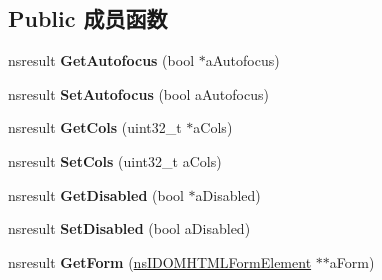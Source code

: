 \subsection*{Public 成员函数}
\begin{DoxyCompactItemize}
\item 
\mbox{\label{interfacens_i_d_o_m_h_t_m_l_text_area_element_a81e1075ea24f0a28fe673ee47a5c7806}} 
nsresult {\bfseries Get\+Autofocus} (bool $\ast$a\+Autofocus)
\item 
\mbox{\label{interfacens_i_d_o_m_h_t_m_l_text_area_element_a15260f463753e149b841ff6d5cf72284}} 
nsresult {\bfseries Set\+Autofocus} (bool a\+Autofocus)
\item 
\mbox{\label{interfacens_i_d_o_m_h_t_m_l_text_area_element_a25c882c3c93f1551d3289b627df73928}} 
nsresult {\bfseries Get\+Cols} (uint32\+\_\+t $\ast$a\+Cols)
\item 
\mbox{\label{interfacens_i_d_o_m_h_t_m_l_text_area_element_a9ba93305d500d5ab18d443630e4375aa}} 
nsresult {\bfseries Set\+Cols} (uint32\+\_\+t a\+Cols)
\item 
\mbox{\label{interfacens_i_d_o_m_h_t_m_l_text_area_element_a64b30982633bdc2f24694e37eb7742eb}} 
nsresult {\bfseries Get\+Disabled} (bool $\ast$a\+Disabled)
\item 
\mbox{\label{interfacens_i_d_o_m_h_t_m_l_text_area_element_a6aa0dd7d0bbbcd29f352a693d4ee201e}} 
nsresult {\bfseries Set\+Disabled} (bool a\+Disabled)
\item 
\mbox{\label{interfacens_i_d_o_m_h_t_m_l_text_area_element_a09955796882fa68d1c0629b8ad2f665f}} 
nsresult {\bfseries Get\+Form} (\hyperlink{interfacens_i_d_o_m_h_t_m_l_form_element}{ns\+I\+D\+O\+M\+H\+T\+M\+L\+Form\+Element} $\ast$$\ast$a\+Form)
\item 
\mbox{\label{interfacens_i_d_o_m_h_t_m_l_text_area_element_adc11cb9585b8654e7939fe0d891880c6}} 
$$
\end{DoxyCompactItemize}
